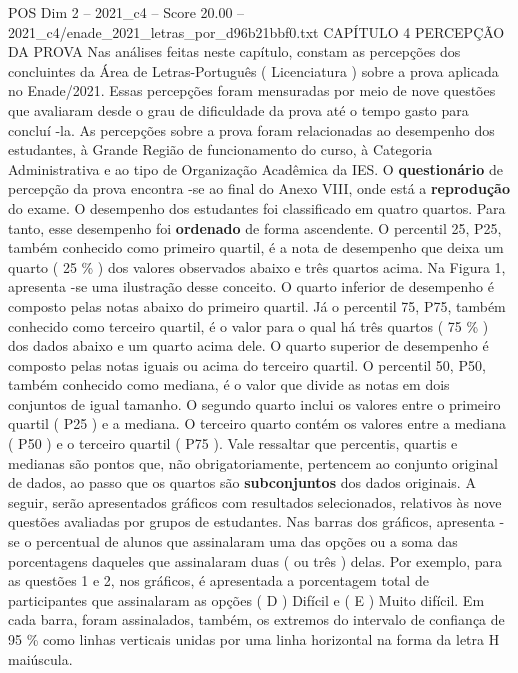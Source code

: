\begin{textsample}{POS Dim 2 – 2021\_c4 – Score 20.00 – 2021\_c4/enade\_2021\_letras\_por\_d96b21bbf0.txt}  \label{ex:f2_pos_034}
CAPÍTULO 4 PERCEPÇÃO DA PROVA Nas análises feitas neste capítulo, constam as percepções dos concluintes da Área de Letras-Português ( Licenciatura ) sobre a prova aplicada no Enade/2021.
Essas percepções foram mensuradas por meio de nove questões que avaliaram desde o grau de dificuldade da prova até o tempo gasto para concluí -la.
As percepções sobre a prova foram relacionadas ao desempenho dos estudantes, à Grande Região de funcionamento do curso, à Categoria Administrativa e ao tipo de Organização Acadêmica da IES.
O \textbf{questionário} de percepção da prova encontra -se ao final do Anexo VIII, onde está a \textbf{reprodução} do exame.
O desempenho dos estudantes foi classificado em quatro quartos.
Para tanto, esse desempenho foi \textbf{ordenado} de forma ascendente.
O percentil 25, P25, também conhecido como primeiro quartil, é a nota de desempenho que deixa um quarto ( 25 \% ) dos valores observados abaixo e três quartos acima.
Na Figura 1, apresenta -se uma ilustração desse conceito.
O quarto inferior de desempenho é composto pelas notas abaixo do primeiro quartil.
Já o percentil 75, P75, também conhecido como terceiro quartil, é o valor para o qual há três quartos ( 75 \% ) dos dados abaixo e um quarto acima dele.
O quarto superior de desempenho é composto pelas notas iguais ou acima do terceiro quartil.
O percentil 50, P50, também conhecido como mediana, é o valor que divide as notas em dois conjuntos de igual tamanho.
O segundo quarto inclui os valores entre o primeiro quartil ( P25 ) e a mediana.
O terceiro quarto contém os valores entre a mediana ( P50 ) e o terceiro quartil ( P75 ).
Vale ressaltar que percentis, quartis e medianas são pontos que, não obrigatoriamente, pertencem ao conjunto original de dados, ao passo que os quartos são \textbf{subconjuntos} dos dados originais.
A seguir, serão apresentados gráficos com resultados selecionados, relativos às nove questões avaliadas por grupos de estudantes.
Nas barras dos gráficos, apresenta -se o percentual de alunos que assinalaram uma das opções ou a soma das porcentagens daqueles que assinalaram duas ( ou três ) delas.
Por exemplo, para as questões 1 e 2, nos gráficos, é apresentada a porcentagem total de participantes que assinalaram as opções ( D ) Difícil e ( E ) Muito difícil.
Em cada barra, foram assinalados, também, os extremos do intervalo de confiança de 95 \% como linhas verticais unidas por uma linha horizontal na forma da letra H maiúscula.

\end{textsample}

